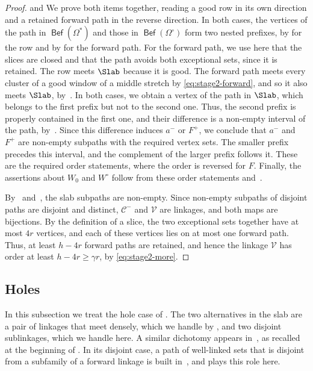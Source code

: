 \documentclass[fontsize=12pt,leading=14pt]{fullpaper}
\DeclareMathOperator{\Bef}{\mathsf{Bef}}
\newcommand{\Ccal}{\mathcal{C}}
\newcommand{\Vcal}{\mathcal{V}}
\newcounter{step}
\begin{document}
\begin{proof}
   and 
  We prove both items together, reading a good row in its own direction and a retained forward path in the reverse direction.
  In both cases, the vertices of the path in $\Bef(\Omega^*)$ and those in $\Bef(\Omega^\circ)$ form two nested prefixes, by  for the row and by  for the forward path.
  For the forward path, we use here that the slices are closed and that the path avoids both exceptional sets, since it is retained.
  The row meets $\Slab$ because it is good.
  The forward path meets every cluster of a good window of a middle stretch by \eqref{eq:stage2-forward}, and so it also meets $\Slab$, by~.
  In both cases, we obtain a vertex of the path in $\Slab$, which belongs to the first prefix but not to the second one.
  Thus, the second prefix is properly contained in the first one, and their difference is a non-empty interval of the path, by~.
  Since this difference induces $a^-$ or $F^+$, we conclude that $a^-$ and $F^+$ are non-empty subpaths with the required vertex sets.
  The smaller prefix precedes this interval, and the complement of the larger prefix follows it.
  These are the required order statements, where the order is reversed for $F$.
  Finally, the assertions about $W_0$ and $W^\circ$ follow from these order statements and~.

  By~ and~, the slab subpaths are non-empty.
  Since non-empty subpaths of disjoint paths are disjoint and distinct, $\Ccal^-$ and $\Vcal$ are linkages, and both maps are bijections.
  By the definition of a slice, the two exceptional sets together have at most $4r$ vertices, and each of these vertices lies on at most one forward path.
  Thus, at least $h-4r$ forward paths are retained, and hence the linkage $\Vcal$ has order at least $h-4r\ge\gamma r$, by \eqref{eq:stage2-more}.
\end{proof}

\subsection{Holes}\label{sec:stage2-hole}

In this subsection we treat the hole case of .
The two alternatives in the slab are a pair of linkages that meet densely, which we handle by , and two disjoint sublinkages, which we handle here.
A similar dichotomy appears in~\cite[Lemma~4.13]{HKMM26b}, as recalled at the beginning of .
In its disjoint case, a path of well-linked sets that is disjoint from a subfamily of a forward linkage is built in~\cite[Lemma~4.9]{HKMM26b}, and  plays this role here.
\end{document}
